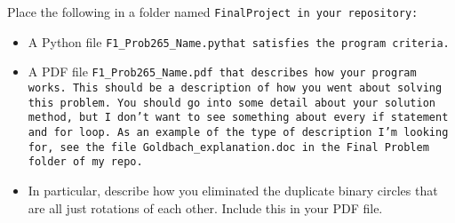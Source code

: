 \documentclass{article}
\newcommand\foldername{\tt{FinalProject} }
\newcommand\filename{\tt{F1\_Prob265\_Name.py}\;\;}
\begin{document}
	
	Place the following in a folder named \foldername in your repository:
	\begin{itemize}
		\item A Python file \filename  that satisfies the program criteria.
		\item A PDF file \tt{F1\_Prob265\_Name.pdf} that describes how your program works.  This should be a description of how you went about solving this problem.  You should go into some detail about your solution method, but I don't want to see something about every \tt{if} statement and \tt{for} loop.  As an example of the type of description I'm looking for, see the file \tt{Goldbach\_explanation.doc} in the \tt{Final Problem} folder of my repo.
		\item In particular, describe how you eliminated the duplicate binary circles that are all just rotations of each other.  Include this in your PDF file.
	\end{itemize}

	
\end{document}
